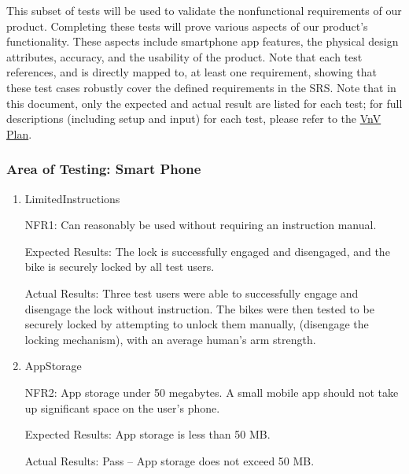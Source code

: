 \documentclass[12pt, titlepage]{article}
\begin{document}
This subset of tests will be used to validate the nonfunctional requirements of our product. Completing these tests will prove various aspects of our product's functionality. These aspects include smartphone app features, the physical design attributes, accuracy, and the usability of the product. Note that each test references, and is directly mapped to, at least one requirement, showing that these test cases robustly cover the defined requirements in the SRS. Note that in this document, only the expected and actual result are listed for each test; for full descriptions (including setup and input) for each test, please refer to the \href{https://github.com/NevoAbigail/Capstone/blob/main/docs/VnVPlan/VnVPlan.pdf}{VnV Plan}.

\subsubsection{Area of Testing: Smart Phone}

\begin{enumerate}

\item{LimitedInstructions

NFR1: Can reasonably be used without requiring an instruction manual. }

Expected Results: The lock is successfully engaged and disengaged, and the bike is securely locked by all test users.

Actual Results: Three test users were able to successfully engage and disengage the lock without instruction. The bikes were then tested to be securely locked by attempting to unlock them manually, (disengage the locking mechanism), with an average human's arm strength. 

\item{AppStorage

NFR2: App storage under 50 megabytes. A small mobile app should not take up significant space on the user’s phone.  }

Expected Results: App storage is less than 50 MB. 

Actual Results: Pass -- App storage does not exceed 50 MB. 

\end{enumerate}
\end{document}
